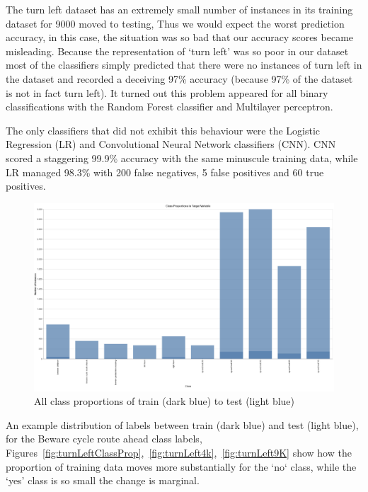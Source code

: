 \documentclass[11pt]{article}
\begin{document}
The turn left dataset has an extremely small number of instances in its training dataset for 9000 moved to testing, Thus we would expect the worst prediction accuracy, in this case, the situation was so bad that our accuracy scores became misleading. Because the representation of ‘turn left’ was so poor in our dataset most of the classifiers simply predicted that there were no instances of turn left in the dataset and recorded a deceiving 97\% accuracy (because 97\% of the dataset is not in fact turn left). It turned out this problem appeared for all binary classifications with the Random Forest classifier and Multilayer perceptron.
\par
The only classifiers that did not exhibit this behaviour were the Logistic Regression (LR) and Convolutional Neural Network classifiers (CNN). CNN scored a staggering 99.9\% accuracy with the same minuscule training data, while LR managed 98.3\% with 200 false negatives, 5 false positives and 60 true positives.
\newline
\par
\begin{figure}[H]
  \caption {All class proportions of train (dark blue) to test (light blue)}
  \centering 
  \includegraphics[width = \textwidth, height = 0.5\textheight, keepaspectratio]{Images/classProportionsInTargetVariable.png}
\end{figure}
An example distribution of labels between train (dark blue) and test (light blue), for the Beware cycle route ahead class labels, Figures~\ref{fig:turnLeftClassProp},~\ref{fig:turnLeft4k},~\ref{fig:turnLeft9K} show how the proportion of training data moves more substantially for the `no` class, while the `yes' class is so small the change is marginal.
\end{document}
